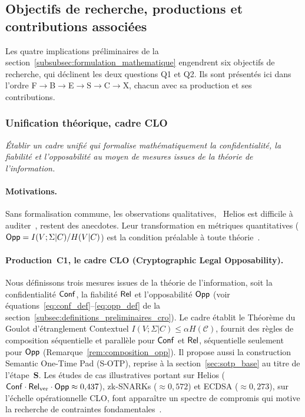 \subsection{Objectifs de recherche, productions et contributions associ\'ees}
\label{subsec:objectifs_recherche}
\begin{sloppypar}
Les quatre implications pr\'eliminaires de la section~\ref{subsubsec:formulation_mathematique} engendrent six objectifs de recherche, qui d\'eclinent les deux questions Q1 et Q2. Ils sont pr\'esent\'es ici dans l'ordre F$\to$B$\to$E$\to$S$\to$C$\to$X, chacun avec sa production et ses contributions.

\subsubsection{Unification th\'eorique, cadre CLO}
\label{subsubsec:obj1_clo}

\begin{objectif}[Formalisation]\label{obj:obj1_unification}
\textit{\'Etablir un cadre unifi\'e qui formalise math\'ematiquement la confidentialit\'e, la fiabilit\'e et l'opposabilit\'e au moyen de mesures issues de la th\'eorie de l'information.}
\end{objectif}

\paragraph{Motivations.}
Sans formalisation commune, les observations qualitatives, \guillemotleft~Helios
est difficile \`a auditer~\guillemotright, restent des anecdotes. Leur transformation
en m\'etriques quantitatives ($\mathsf{Opp} = I(V;\Sigma|C)/H(V|C)$) est la
condition pr\'ealable \`a toute th\'eorie~\cite{Clarkson05,Smith09,Alvim12}.

\paragraph{Production~C1, le cadre CLO (Cryptographic Legal Opposability).}
Nous d\'efinissons trois mesures issues de la th\'eorie de l'information, soit
la confidentialit\'e $\mathsf{Conf}$, la fiabilit\'e $\mathsf{Rel}$ et l'opposabilit\'e $\mathsf{Opp}$ (voir
\'equations~\eqref{eq:conf_def}--\eqref{eq:opp_def} de la section~\ref{subsec:definitions_preliminaires_cro}). Le cadre \'etablit le Th\'eor\`eme du Goulot
d'\'etranglement Contextuel $I(V;\Sigma|C) \leq \alpha H(\mathcal{C})$,
fournit des r\`egles de composition s\'equentielle et parall\`ele pour $\mathsf{Conf}$ et $\mathsf{Rel}$, s\'equentielle seulement pour $\mathsf{Opp}$ (Remarque~\ref{rem:composition_opp}). Il
propose aussi la construction Semantic One-Time Pad (S-OTP), reprise \`a la
section~\ref{sec:sotp_base} au titre de l'\'etape~\textbf{S}. Les \'etudes de cas
illustratives portant sur Helios ($\mathsf{Conf} \cdot \mathsf{Rel}_{\mathrm{ver}} \cdot \mathsf{Opp} \approx
0{,}437$), zk-SNARKs ($\approx 0{,}572$) et ECDSA ($\approx 0{,}273$), sur
l'\'echelle op\'erationnelle CLO, font appara\^itre un spectre de compromis
qui motive la recherche de contraintes fondamentales~\cite{Adida08,Groth16,Johnson01}.


\end{sloppypar}
